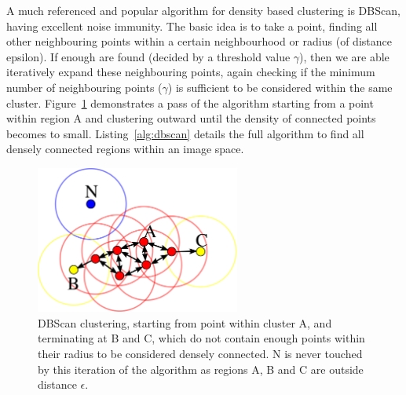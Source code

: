 \documentclass[]{article}
\begin{document}
{A much referenced and popular algorithm for density based clustering is \ac{DBScan}, having excellent noise immunity. The basic idea is to take a point, finding all other neighbouring points within a certain neighbourhood or radius (of distance epsilon). If enough are found (decided by a threshold value $\gamma$), then we are able iteratively expand these neighbouring points, again checking if the minimum number of neighbouring points ($\gamma$) is sufficient to be considered within the same cluster. Figure~\ref{fig:dbscan} demonstrates a pass of the algorithm starting from a point within region A and clustering outward until the density of connected points becomes to small. Listing~\ref{alg:dbscan} details the full algorithm to find all densely connected regions within an image space.

\begin{figure}[bt]
	\begin{center}
		\includegraphics[width=0.6\textwidth]{2000px-DBSCAN-Illustration.png}
	\end{center}
	\caption{\ac{DBScan} clustering, starting from point within cluster A, and terminating at B and C, which do not contain enough points within their radius to be considered densely connected. N is never touched by this iteration of the algorithm as regions A, B and C are outside distance $\epsilon$.}
	\label{fig:dbscan}

\end{figure}

}
\end{document}
